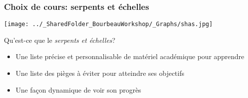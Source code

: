 \documentclass{beamer}
\begin{document}
   \begin{frame}
    
      \frametitle{Choix de cours: serpents et échelles} \vspace{1cm}
      
      
        \begin{center}
        
          \texttt{[image: ../\_SharedFolder\_BourbeauWorkshop/\_Graphs/shas.jpg]}
         
        \end{center} 
      
    Qu'est-ce que le \textit{serpents et échelles}?

        \begin{itemize}
          \item{Une liste précise et personnalisable de matériel académique pour apprendre \R}
          \item{Une liste des pièges à éviter pour atteindre ses objectifs}
          \item{Une façon dynamique de voir son progrès}
        \end{itemize}

    \end{frame}

\end{document}
